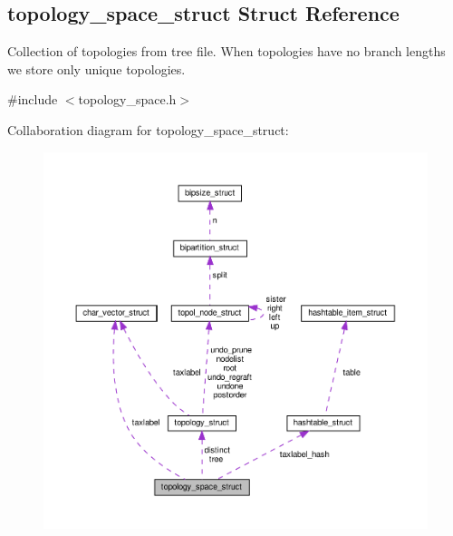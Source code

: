 \hypertarget{structtopology__space__struct}{}\subsection{topology\+\_\+space\+\_\+struct Struct Reference}
\label{structtopology__space__struct}


Collection of topologies from tree file. When topologies have no branch lengths we store only unique topologies.  




{\ttfamily \#include $<$topology\+\_\+space.\+h$>$}



Collaboration diagram for topology\+\_\+space\+\_\+struct\+:\nopagebreak
\begin{figure}[H]
\begin{center}
\leavevmode
\includegraphics[width=350pt]{structtopology__space__struct__coll__graph}
\end{center}
\end{figure}
